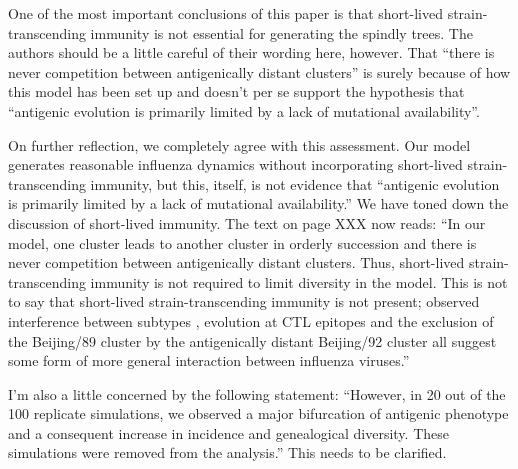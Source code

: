\documentclass[11pt,oneside,letterpaper]{article}
\def\comment#1{
#1
}
\def\response#1{
\begin{bf}
#1
\end{bf}
}
\def\break{\vspace{0.2cm}}
\begin{document}
\break

\comment{One of the most important conclusions of this paper is that short-lived strain-transcending immunity is not essential for generating the spindly trees. The authors should be a little careful of their wording here, however. That ``there is never competition between antigenically distant clusters'' is surely because of how this model has been set up and doesn't per se support the hypothesis that ``antigenic evolution is primarily limited by a lack of mutational availability''.}

\response{On further reflection, we completely agree with this assessment.  Our model generates reasonable influenza dynamics without incorporating short-lived strain-transcending immunity, but this, itself, is not evidence that ``antigenic evolution is primarily limited by a lack of mutational availability.''  We have toned down the discussion of short-lived immunity.  The text on page XXX now reads: ``In our model, one cluster leads to another cluster in orderly succession and there is never competition between antigenically distant clusters.  Thus, short-lived strain-transcending immunity is not required to limit diversity in the model.  This is not to say that short-lived strain-transcending immunity is not present; observed interference between subtypes \cite{Ferguson03,Goldstein11}, evolution at CTL epitopes \cite{Voeten00} and the exclusion of the Beijing/89 cluster by the antigenically distant Beijing/92 cluster \cite{Smith04} all suggest some form of more general interaction between influenza viruses.''}

\break

\comment{I'm also a little concerned by the following statement: ``However, in 20 out of the 100 replicate simulations, we observed a major bifurcation of antigenic phenotype and a consequent increase in incidence and genealogical diversity. These simulations were removed from the analysis.'' This needs to be clarified.}
\end{document}
